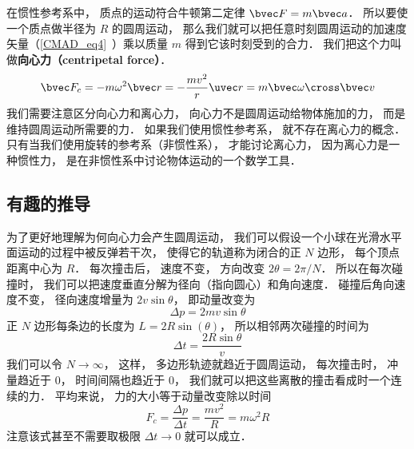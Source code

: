 

在惯性参考系中， 质点的运动符合牛顿第二定律 $\bvec F = m\bvec a$． 所以要使一个质点做半径为 $R$ 的圆周运动， 那么我们就可以把任意时刻圆周运动的加速度矢量（\autoref{CMAD_eq4}~）乘以质量 $m$ 得到它该时刻受到的合力． 我们把这个力叫做\textbf{向心力（centripetal force）}．
\begin{equation}
\bvec F_c = -m \omega^2 \bvec r = -\frac{mv^2}{r}\uvec r = m\bvec \omega \cross \bvec v
\end{equation}
我们需要注意区分向心力和离心力， 向心力不是圆周运动给物体施加的力， 而是维持圆周运动所需要的力． 如果我们使用惯性参考系， 就不存在离心力的概念． 只有当我们使用旋转的参考系（非惯性系）， 才能讨论离心力， 因为离心力是一种惯性力， 是在非惯性系中讨论物体运动的一个数学工具．

\subsection{有趣的推导}
为了更好地理解为何向心力会产生圆周运动， 我们可以假设一个小球在光滑水平面运动的过程中被反弹若干次， 使得它的轨道称为闭合的正 $N$ 边形， 每个顶点距离中心为 $R$． 每次撞击后， 速度不变， 方向改变 $2\theta  = 2\pi/N$．
所以在每次碰撞时， 我们可以把速度垂直分解为径向（指向圆心）和角向速度． 碰撞后角向速度不变， 径向速度增量为 $2v\sin\theta$， 即动量改变为
\begin{equation}
\Delta p = 2mv\sin\theta
\end{equation}
正 $N$ 边形每条边的长度为 $L = 2R\sin(\theta)$， 所以相邻两次碰撞的时间为
\begin{equation}
\Delta t = \frac{2R\sin\theta}{v}
\end{equation}
我们可以令 $N \to \infty$， 这样， 多边形轨迹就趋近于圆周运动， 每次撞击时， 冲量趋近于 0， 时间间隔也趋近于 0， 我们就可以把这些离散的撞击看成时一个连续的力． 平均来说， 力的大小等于动量改变除以时间
\begin{equation}
F_c = \frac{\Delta p}{\Delta t} = \frac{mv^2}{R} = m\omega^2 R
\end{equation}
注意该式甚至不需要取极限 $\Delta t \to 0$ 就可以成立．


